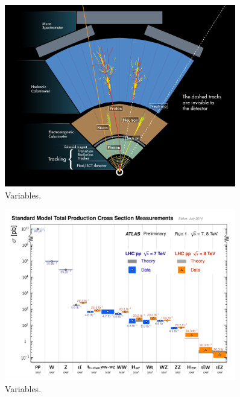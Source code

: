 \begin{figure}[tp]
  \centering
  \includegraphics[width=0.90\textwidth]{figures/lhc-atlas/atlas-wedge-1301009_01.jpg}
  \caption{Variables.}
  \label{fig:atlas-wedge}
\end{figure}

\begin{figure}[tp]
  \centering
  \includegraphics[width=0.90\textwidth]{figures/lhc-atlas/ATLAS_a_SMSummary_TotalXsect}
  \caption{Variables.}
  \label{fig:atlas-measurements}
\end{figure}


